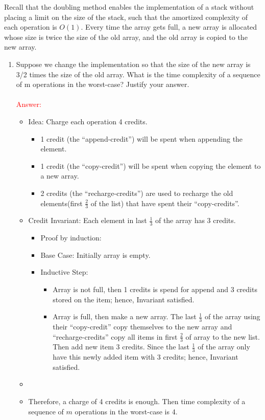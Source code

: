 \documentclass[11pt,twoside]{article}
\begin{document}
\begin{enumerate}[leftmargin=0pt]
Recall that the doubling method enables the implementation of
a stack without placing a limit on the size of the stack, such that the
amortized complexity of each operation is $O(1)$. Every time the array
gets full, a new array is allocated whose size is twice the size of the
old array, and the old array is copied to the new array.

\begin{enumerate}
\item 

Suppose we change the implementation so that the size of the new array is 3/2 times the size of the old array. 
What is the time complexity of a sequence of m operations in the worst-case? Justify your answer.\\
\\
\textcolor{red}{\sc Answer:}

\begin{itemize}[label = {}]
\item Idea: Charge each operation 4 credits.
	\begin{itemize} 
	\item 1 credit  (the ``append-credit'') will be spent when appending the element.
	\item 1 credit (the ``copy-credit'') will be spent when copying the element to a new array.
	\item  2 credits (the ``recharge-credits'') are  used to recharge the old elements(first $\frac{2}{3}$ of the list) that have spent their ``copy-credits''.
	\end{itemize}	
\item Credit Invariant: Each element in last $\frac{1}{3}$  of the array has 3 credits.\\
	\begin{itemize}[label = {}]
	\item Proof by induction:
	\item Base Case: Initially array is empty.
	\item Inductive Step: 
		\begin{itemize}[label = {-}]
		\item  Array is not full, then 1 credits is spend for append and 3 credits stored on the item; hence, Invariant satisfied.
		\item  Array is full, then make a new array.  The last $\frac{1}{3}$  of the array using their ``copy-credit'' copy themselves to the new array 
		and  ``recharge-credits'' copy all items in first $\frac{2}{3}$ of array to the new list. Then add new item 3 credits. Since the  last $\frac{1}{3}$  of the array
		only have this newly added item with 3 credits; hence, Invariant satisfied.
		\end{itemize}	
	\end{itemize}
\item 
\item Therefore,  a charge of 4 credits is enough. Then time complexity of a sequence of $m$ operations in the worst-case is 4.
\end{itemize}


\end{enumerate}
\end{enumerate}
\end{document}
